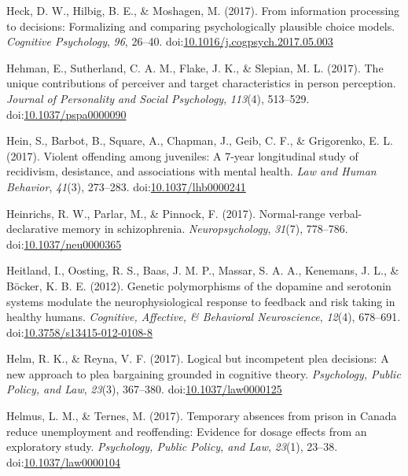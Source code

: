 \documentclass[english,man]{apa6}
\begin{document}
\hypertarget{ref-Heck2017}{}
Heck, D. W., Hilbig, B. E., \& Moshagen, M. (2017). From information
processing to decisions: Formalizing and comparing psychologically
plausible choice models. \emph{Cognitive Psychology}, \emph{96}, 26--40.
doi:\href{https://doi.org/10.1016/j.cogpsych.2017.05.003}{10.1016/j.cogpsych.2017.05.003}

\hypertarget{ref-Hehman2017}{}
Hehman, E., Sutherland, C. A. M., Flake, J. K., \& Slepian, M. L.
(2017). The unique contributions of perceiver and target characteristics
in person perception. \emph{Journal of Personality and Social
Psychology}, \emph{113}(4), 513--529.
doi:\href{https://doi.org/10.1037/pspa0000090}{10.1037/pspa0000090}

\hypertarget{ref-Hein2017}{}
Hein, S., Barbot, B., Square, A., Chapman, J., Geib, C. F., \&
Grigorenko, E. L. (2017). Violent offending among juveniles: A 7-year
longitudinal study of recidivism, desistance, and associations with
mental health. \emph{Law and Human Behavior}, \emph{41}(3), 273--283.
doi:\href{https://doi.org/10.1037/lhb0000241}{10.1037/lhb0000241}

\hypertarget{ref-Heinrichs2017}{}
Heinrichs, R. W., Parlar, M., \& Pinnock, F. (2017). Normal-range
verbal-declarative memory in schizophrenia. \emph{Neuropsychology},
\emph{31}(7), 778--786.
doi:\href{https://doi.org/10.1037/neu0000365}{10.1037/neu0000365}

\hypertarget{ref-Heitland2012}{}
Heitland, I., Oosting, R. S., Baas, J. M. P., Massar, S. A. A.,
Kenemans, J. L., \& Böcker, K. B. E. (2012). Genetic polymorphisms of
the dopamine and serotonin systems modulate the neurophysiological
response to feedback and risk taking in healthy humans. \emph{Cognitive,
Affective, \& Behavioral Neuroscience}, \emph{12}(4), 678--691.
doi:\href{https://doi.org/10.3758/s13415-012-0108-8}{10.3758/s13415-012-0108-8}

\hypertarget{ref-Helm2017}{}
Helm, R. K., \& Reyna, V. F. (2017). Logical but incompetent plea
decisions: A new approach to plea bargaining grounded in cognitive
theory. \emph{Psychology, Public Policy, and Law}, \emph{23}(3),
367--380.
doi:\href{https://doi.org/10.1037/law0000125}{10.1037/law0000125}

\hypertarget{ref-Helmus2017}{}
Helmus, L. M., \& Ternes, M. (2017). Temporary absences from prison in
Canada reduce unemployment and reoffending: Evidence for dosage effects
from an exploratory study. \emph{Psychology, Public Policy, and Law},
\emph{23}(1), 23--38.
doi:\href{https://doi.org/10.1037/law0000104}{10.1037/law0000104}
\end{document}
